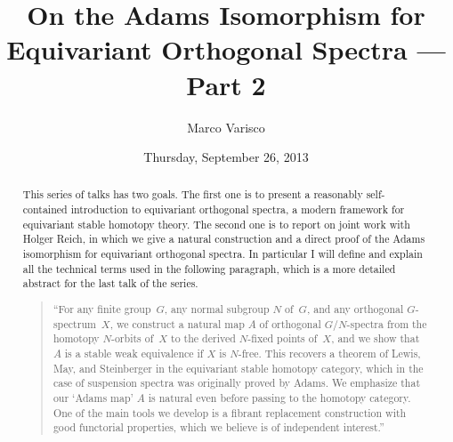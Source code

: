 \documentclass{UAmathtalk}
\author{Marco Varisco}
\title{On the Adams Isomorphism for Equivariant Orthogonal Spectra --- Part 2}
\date{Thursday, September 26, 2013}
\begin{document}
\maketitle

\begin{abstract}
This series of talks has two goals.
The first one is to present a reasonably self-contained introduction to equivariant orthogonal spectra, a modern framework for equivariant stable homotopy theory.
The second one is to report on joint work with Holger Reich, in which we give a natural construction and a direct proof of the Adams isomorphism for equivariant orthogonal spectra.
In particular I will define and explain all the technical terms used in the following paragraph, which is a more detailed abstract for the last talk of the series.
\begin{quote}
``For any finite group~$G$, any normal subgroup $N$ of~$G$, and any orthogonal $G$-spectrum~$X$, we construct a natural map $A$ of orthogonal $G/N$-spectra from the homotopy $N$-orbits of~$X$ to the derived $N$-fixed points of~$X$, and we show that $A$ is a stable weak equivalence if $X$ is $N$-free.  This recovers a theorem of Lewis, May, and Steinberger in the equivariant stable homotopy category, which in the case of suspension spectra was originally proved by Adams.  We emphasize that our `Adams map' $A$ is natural even before passing to the homotopy category.  One of the main tools we develop is a fibrant replacement construction with good functorial properties, which we believe is of independent interest.''
\end{quote}
\end{abstract}
\end{document}
